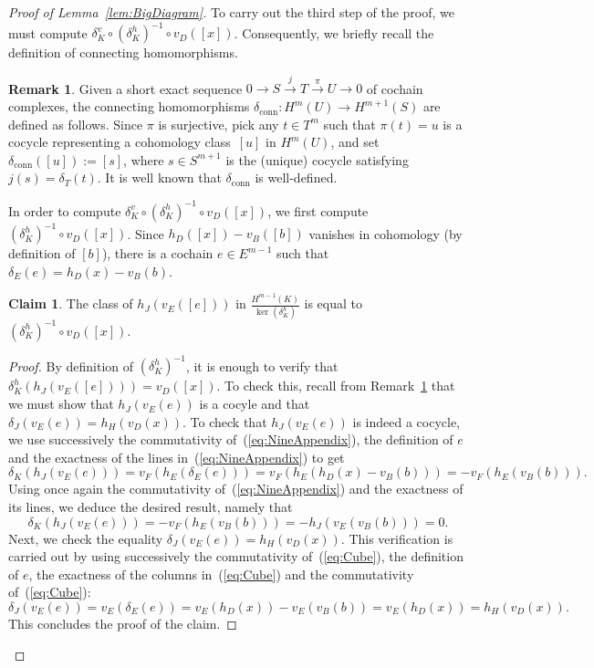 \documentclass[11pt,a4paper]{amsart}
\theoremstyle{definition}
\newtheorem{remark}[theorem]{Remark}
\newtheorem*{claim}{Claim}
\begin{document}
\begin{proof}[Proof of Lemma~\ref{lem:BigDiagram}]
To carry out the third step of the proof, we must compute $\delta_K^v \circ (\delta_K^h)^{-1}\circ v_D([x])$. Consequently, we briefly recall the definition of connecting homomorphisms.

\begin{remark}
\label{rem:Connecting}
Given a short exact sequence $0 \to S \stackrel{j}{\to} T \stackrel{\pi}{\to} U \to 0$ of cochain complexes, the connecting homomorphisms $\delta_{\text{conn}} \colon H^m(U) \to H^{m+1}(S)$ are defined as follows. Since $\pi$ is surjective, pick any $t \in T^m$ such that $\pi(t)=u$ is a cocycle representing a cohomology class~$[u]$ in $H^m(U)$, and set $\delta_{\text{conn}} ([u]):=[s]$, where $s \in S^{m+1}$ is the (unique) cocycle satisfying $j(s)=\delta_T(t)$. It is well known that $\delta_{\text{conn}}$ is well-defined.
\end{remark}
In order to compute $\delta_K^v \circ (\delta_K^h)^{-1}\circ v_D([x])$, we first compute $(\delta_K^h)^{-1}\circ v_D([x])$. Since $h_D([x])-v_B([b])$ vanishes in cohomology (by definition of $[b]$), there is a cochain $e\in E^{m-1}$ such that~$\delta_E (e)=h_D(x)-v_B(b)$.

\begin{claim}
The class of $h_J(v_E([e]))$ in $\frac{H^{m-1}(K)}{\ker(\delta^h_K)}$ is equal to $(\delta_K^h)^{-1} \circ v_D([x])$.
\end{claim}
\begin{proof} 
By definition of $(\delta_K^h)^{-1}$, it is enough to verify that $\delta_K^h(h_J(v_E([e])))=v_D([x])$. To check this, recall from Remark~\ref{rem:Connecting} that we must show that $h_J(v_E(e))$ is a cocyle and that $\delta_J(v_E(e))=h_H(v_D(x))$. To check that $h_J(v_E(e))$ is indeed a cocycle, we use successively the commutativity of~(\ref{eq:NineAppendix}), the definition of $e$ and the exactness of the lines in~(\ref{eq:NineAppendix}) to get
$$\delta_K(h_J(v_E(e)))=v_F(h_E(\delta_E(e)))=v_F(h_E(h_D(x)-v_B(b)))=-v_F(h_E(v_B(b))).$$
Using once again the commutativity of~(\ref{eq:NineAppendix}) and the exactness of its lines, we deduce the desired result, namely that
$$\delta_K(h_J(v_E(e)))=-v_F(h_E(v_B(b)))=-h_J(v_E(v_B(b)))=0.$$
 Next, we check the equality $\delta_J(v_E(e))=h_H(v_D(x))$. This verification is carried out by using successively the commutativity of~(\ref{eq:Cube}), the definition of $e$, the exactness of the columns in~(\ref{eq:Cube}) and the commutativity of~(\ref{eq:Cube}):
 $$\delta_J(v_E(e))=v_E(\delta_E(e))=v_E(h_D(x))-v_E(v_B(b))=v_E(h_D(x))=h_H(v_D(x)).$$
This concludes the proof of the claim.
\end{proof}
 

\end{proof}
\end{document}
